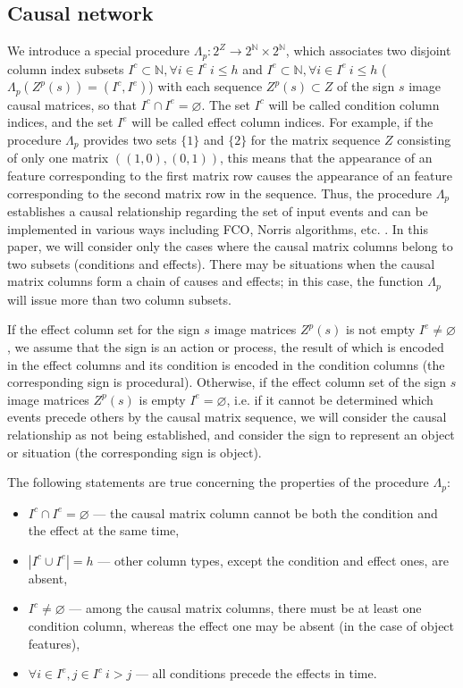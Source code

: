 \documentclass[12pt]{scrartcl}
\begin{document}
	\subsection{Causal network}
	
	We introduce a special procedure $\Lambda_p: 2^Z\rightarrow 2^{\mathbb N}\times 2^{\mathbb N}$, which associates two disjoint column index subsets $I^c\subset\mathbb N, \forall i\in I^c\ i\leq h$ and $I^e\subset\mathbb N, \forall i\in I^e\ i\leq h$ ($\Lambda_p(Z^p(s))=(I^c,I^e)$) with each sequence $Z^p(s)\subset Z$ of the sign $s$ image causal matrices, so that $I^c\cap I^e=\varnothing$. The set $I^c$ will be called condition column indices, and the set $I^e$ will be called effect column indices. For example, if the procedure $\Lambda_p$ provides two sets $\{1\}$ and $\{2\}$ for the matrix sequence $Z$ consisting of only one matrix $((1, 0), (0, 1))$, this means that the appearance of an feature corresponding to the first matrix row causes the appearance of an feature corresponding to the second matrix row in the sequence. Thus, the procedure $\Lambda_p$ establishes a causal relationship regarding the set of input events and can be implemented in various ways including FCO, Norris algorithms, etc. \cite{Kuznetsov2001,Kuznetsov1996}. In this paper, we will consider only the cases where the causal matrix columns belong to two subsets (conditions and effects). There may be situations when the causal matrix columns form a chain of causes and effects; in this case, the function $\Lambda_p$ will issue more than two column subsets.
	
	If the effect column set for the sign  $s$ image matrices $Z^p(s)$ is not empty $I^e \not=\varnothing$, we assume that the sign is an action or process, the result of which is encoded in the effect columns and its condition is encoded in the condition columns (the corresponding sign is procedural). Otherwise, if the effect column set of the sign $s$ image matrices $Z^p(s)$ is empty  $I^e=\varnothing$, i.e. if it cannot be determined which events precede others by the causal matrix sequence, we will consider the causal relationship as not being established, and consider the sign to represent an object or situation (the corresponding sign is object).
		
	The following statements are true concerning the properties of the procedure $\Lambda_p$:
	\begin{itemize}
		\item $I^c\cap I^e=\varnothing$ --- the causal matrix column cannot be both the condition and the effect at the same time,
		\item $|I^c\cup I^e|=h$ --- other column types, except the condition and effect ones, are absent,
		\item $I^c\not = \varnothing$ --- among the causal matrix columns, there must be at least one condition column, whereas the effect one may be absent (in the case of object features),
		\item $\forall i\in I^e, j\in I^c\ i>j$ --- all conditions precede the effects in time.
	\end{itemize}
	
\end{document}
